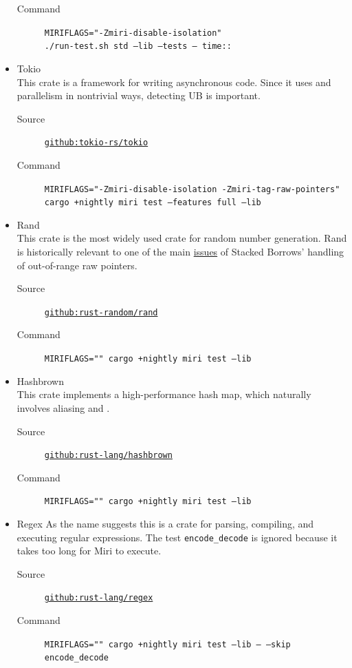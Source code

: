 \documentclass[a4paper,11pt]{article}
\theoremstyle{plain}
\theoremstyle{definition}
\theoremstyle{remark}
\newcommand{\tcode}[1]{\rstinline{#1}}
\begin{document}
\begin{itemize}
\begin{description}
            \item[Command] \texttt{MIRIFLAGS="-Zmiri-disable-isolation"}\\
                \texttt{./run-test.sh std --lib --tests -- time::}
        \end{description}
    \item Tokio\\
        This crate is a framework for writing asynchronous code. Since it uses \tcode{unsafe} and
        parallelism in nontrivial ways, detecting UB is important.
        \begin{description}
            \item[Source] \href{https://github.com/tokio-rs/tokio}{\texttt{github:tokio-rs/tokio}}
            \item[Command] \texttt{MIRIFLAGS="-Zmiri-disable-isolation -Zmiri-tag-raw-pointers"} \\
                \texttt{cargo +nightly miri test --features full --lib}
        \end{description}
    \item Rand\\
        This crate is the most widely used crate for random number generation.
        Rand is historically relevant to one of the main
        \href{https://github.com/rust-lang/unsafe-code-guidelines/issues/134}{issues}
        of Stacked Borrows' handling of out-of-range raw pointers.
        \begin{description}
            \item[Source] \href{https://github.com/rust-random/rand}{\texttt{github:rust-random/rand}}
            \item[Command] \texttt{MIRIFLAGS="" cargo +nightly miri test --lib}
        \end{description}
    \item Hashbrown\\
        This crate implements a high-performance hash map, which naturally involves aliasing and \tcode{unsafe}.
        \begin{description}
            \item[Source] \href{https://github.com/rust-lang/hashbrown}{\texttt{github:rust-lang/hashbrown}}
            \item[Command] \texttt{MIRIFLAGS="" cargo +nightly miri test --lib}
        \end{description}
    \item Regex
        As the name suggests this is a crate for parsing, compiling, and executing regular expressions.
        The test \texttt{encode\_decode} is ignored because it takes too long for Miri to execute.
        \begin{description}
            \item[Source] \href{https://github.com/rust-lang/regex}{\texttt{github:rust-lang/regex}}
            \item[Command] \texttt{MIRIFLAGS="" cargo +nightly miri test --lib -- --skip encode\_decode}
        \end{description}
\end{itemize}
\end{document}
